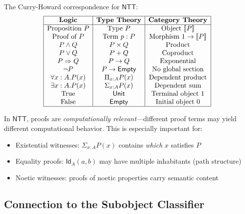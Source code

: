 \begin{definition}
\label{def:curry-howard-dictionary}
The Curry-Howard correspondence for $\mathsf{NTT}$:
\[
\begin{array}{|c|c|c|}
\hline
\textbf{Logic} & \textbf{Type Theory} & \textbf{Category Theory} \\
\hline
\text{Proposition } P & \text{Type } P & \text{Object } \llbracket P \rrbracket \\
\text{Proof of } P & \text{Term } p : P & \text{Morphism } 1 \to \llbracket P \rrbracket \\
P \land Q & P \times Q & \text{Product} \\
P \lor Q & P + Q & \text{Coproduct} \\
P \Rightarrow Q & P \to Q & \text{Exponential} \\
\neg P & P \to \mathsf{Empty} & \text{No global section} \\
\forall x : A. P(x) & \Pi_{x:A} P(x) & \text{Dependent product} \\
\exists x : A. P(x) & \Sigma_{x:A} P(x) & \text{Dependent sum} \\
\text{True} & \mathsf{Unit} & \text{Terminal object } 1 \\
\text{False} & \mathsf{Empty} & \text{Initial object } 0 \\
\hline
\end{array}
\]
\end{definition}

\begin{remark}
\label{rem:proof-relevance}
In $\mathsf{NTT}$, proofs are \emph{computationally relevant}---different proof
terms may yield different computational behavior. This is especially important
for:
\begin{itemize}
  \item Existential witnesses: $\Sigma_{x:A} P(x)$ contains \emph{which} $x$
        satisfies $P$
  \item Equality proofs: $\mathsf{Id}_A(a, b)$ may have multiple inhabitants
        (path structure)
  \item Noetic witnesses: proofs of noetic properties carry semantic content
\end{itemize}
\end{remark}

\subsection{Connection to the Subobject Classifier}
\label{subsec:omega-connection}

